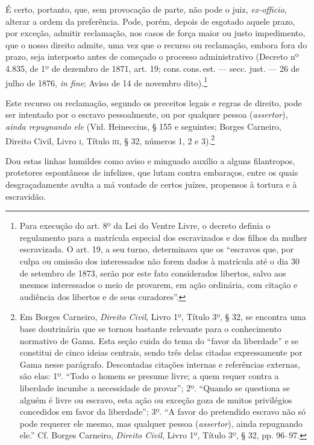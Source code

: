 É certo, portanto, que, sem provocação de parte, não pode o juiz,
\emph{ex-officio}, alterar a ordem da preferência. Pode, porém, depois
de esgotado aquele prazo, por exceção, admitir reclamação, nos casos de
força maior ou justo impedimento, que o nosso direito admite, uma vez
que o recurso ou reclamação, embora fora do prazo, seja interposto antes
de começado o processo administrativo
(Decreto nº 4.835, de 1º de
dezembro de 1871, art. 19; cons.\,cons.\,est. --- secc. just. --- 26 de julho
de 1876, \emph{in fine}; Aviso de 14 de novembro dito).\footnote{Para
  execução do art. 8º da Lei do Ventre Livre, o decreto definia o
  regulamento para a matrícula especial dos escravizados e dos filhos da
  mulher escravizada. O art. 19, a seu turno, determinava que os
  ``escravos que, por culpa ou omissão dos interessados não forem dados à
  matrícula até o dia 30 de setembro de 1873, serão por este fato
  considerados libertos, salvo aos mesmos interessados o meio de
  provarem, em ação ordinária, com citação e audiência dos libertos e de
  seus curadores''.}

Este recurso ou reclamação, segundo os preceitos legais e regras de
direito, pode ser intentado por o escravo pessoalmente, ou por qualquer
pessoa (\emph{assertor}), \emph{ainda repugnando ele} (Vid.
Heineccius, § 155 e seguintes; Borges Carneiro, Direito Civil,
Livro \textsc{i}, Título \textsc{iii}, § 32, números 1, 2 e 3).\footnote{Em Borges
  Carneiro, \emph{Direito Civil}, Livro 1º, Título 3º, § 32, se encontra
  uma base doutrinária que se tornou bastante relevante para o
  conhecimento normativo de Gama. Esta seção cuida do tema do ``favor da
  liberdade'' e se constitui de cinco ideias centrais, sendo três delas
  citadas expressamente por Gama nesse parágrafo. Descontadas citações
  internas e referências externas, são elas: 1º. ``Todo o homem se
  presume livre; a quem requer contra a liberdade incumbe a necessidade
  de provar''; 2º. ``Quando se questiona se alguém é livre ou
  escravo, esta ação ou exceção goza de muitos privilégios concedidos em
  favor da liberdade''; 3º. ``A favor do pretendido escravo não só pode
  requerer ele mesmo, mas qualquer pessoa (\emph{assertor}), ainda
  repugnando ele.'' Cf. Borges Carneiro, \emph{Direito Civil}, Livro 1º,
  Título 3º, § 32, pp. 96--97.}

Dou estas linhas humildes
como aviso e minguado auxílio a alguns filantropos, protetores
espontâneos de infelizes, que lutam contra embaraços, entre os quais
desgraçadamente avulta a má vontade de certos juízes, propensos à
tortura e à escravidão.

